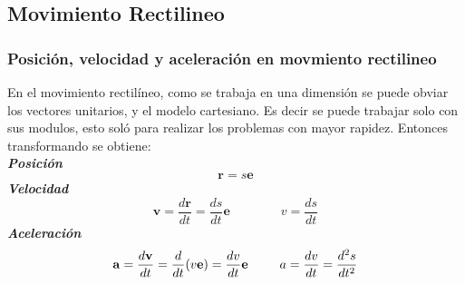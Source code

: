 \subsection*{Movimiento Rectilineo}
\subsubsection*{Posición, velocidad y aceleración en movmiento rectilineo}
En el movimiento rectilíneo, como se trabaja en una dimensión se puede obviar los vectores unitarios, y el modelo cartesiano. Es decir se puede trabajar solo con sus modulos, esto soló para realizar los problemas con mayor rapidez. Entonces transformando se obtiene: \\
\textbf{\textit{Posición}}
$$ \mathbf{r}= s\mathbf{e} $$
\textbf{\textit{Velocidad}}
$$ \mathbf{v}=\frac{d\mathbf{r}}{dt}=\frac{ds}{dt}\mathbf{e} \hspace{4em} v=\frac{ds}{dt}  $$
\textbf{\textit{Aceleración}}
$$ \mathbf{a}=\frac{d\mathbf{v}}{dt}=\frac{d}{dt}(v\mathbf{e})=\frac{dv}{dt}\mathbf{e} \hspace{2.5em} a=\frac{dv}{dt}=\frac{d^2s}{dt^2} $$
